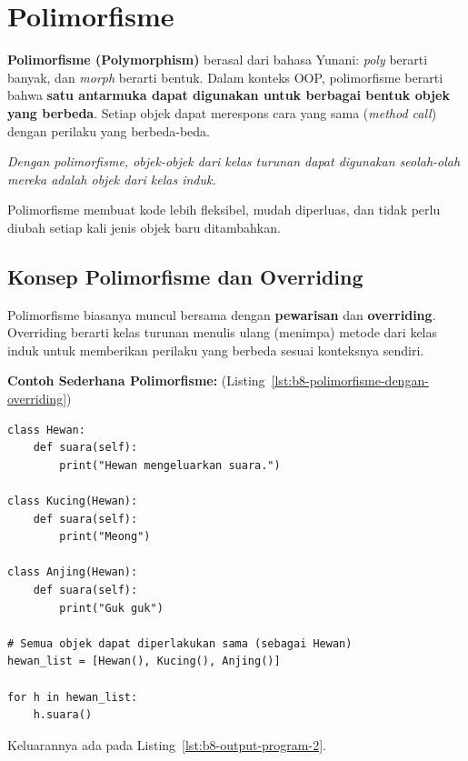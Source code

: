 \section{Polimorfisme}

\textbf{Polimorfisme (Polymorphism)} berasal dari bahasa Yunani: \emph{poly} berarti banyak, dan \emph{morph} berarti bentuk.  
Dalam konteks OOP, polimorfisme berarti bahwa \textbf{satu antarmuka dapat digunakan untuk berbagai bentuk objek yang berbeda}.  
Setiap objek dapat merespons cara yang sama (\emph{method call}) dengan perilaku yang berbeda-beda.

\begin{center}
\textit{Dengan polimorfisme, objek-objek dari kelas turunan dapat digunakan seolah-olah mereka adalah objek dari kelas induk.}
\end{center}

Polimorfisme membuat kode lebih fleksibel, mudah diperluas, dan tidak perlu diubah setiap kali jenis objek baru ditambahkan.

\subsection{Konsep Polimorfisme dan Overriding}

Polimorfisme biasanya muncul bersama dengan \textbf{pewarisan} dan \textbf{overriding}.  
Overriding berarti kelas turunan menulis ulang (menimpa) metode dari kelas induk untuk memberikan perilaku yang berbeda sesuai konteksnya sendiri.

\textbf{Contoh Sederhana Polimorfisme:} (Listing~\ref{lst:b8-polimorfisme-dengan-overriding})

\begin{lstlisting}[style=PythonStyle, caption={Polimorfisme dengan Overriding}, label={lst:b8-polimorfisme-dengan-overriding}]
class Hewan:
    def suara(self):
        print("Hewan mengeluarkan suara.")

class Kucing(Hewan):
    def suara(self):
        print("Meong")

class Anjing(Hewan):
    def suara(self):
        print("Guk guk")

# Semua objek dapat diperlakukan sama (sebagai Hewan)
hewan_list = [Hewan(), Kucing(), Anjing()]

for h in hewan_list:
    h.suara()
\end{lstlisting}

Keluarannya ada pada Listing~\ref{lst:b8-output-program-2}.

